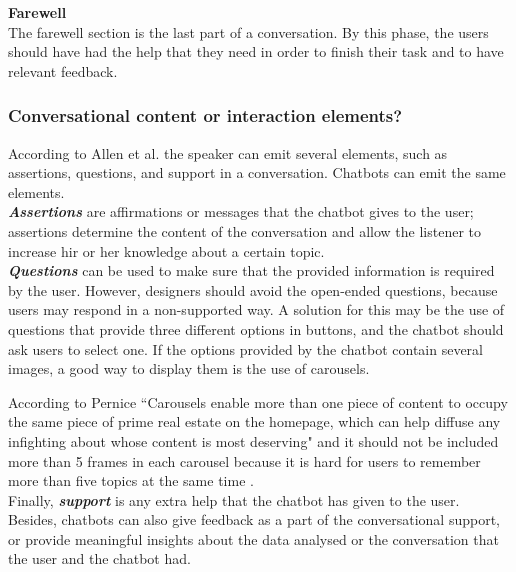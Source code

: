 \documentclass[a4paper,10pt]{article}
\begin{document}
\textbf{Farewell}\\[0\baselineskip]
The farewell section is the last part of a conversation. By this phase, the users should have had the help that they need in order to finish their task and to have relevant feedback.  


\subsubsection*{Conversational content or interaction elements?}
According to Allen et al. \cite{allen1978conversation} the speaker can emit several elements, such as assertions, questions, and support in a conversation. Chatbots can emit the same elements. \\[0\baselineskip]

\textbf{\textit{Assertions}} are affirmations or messages that the chatbot gives to the user; assertions determine the content of the conversation and allow the listener to increase hir or her knowledge about a certain topic. \\[0\baselineskip]

\textbf{\textit{Questions}} can be used to make sure that the provided information is required by the user. However, designers should avoid the open-ended questions, because users may respond in a non-supported way. A solution for this may be the use of questions that provide three different options in buttons, and the chatbot should ask users to select one. If the options provided by the chatbot contain several images, a good way to display them is the use of carousels. 

According to Pernice ``Carousels enable more than one piece of content to occupy the same piece of prime real estate on the homepage, which can help diffuse any infighting about whose content is most deserving" and it should not be included more than 5 frames in each carousel because it is hard for users to remember more than five topics at the same time \cite{carousel}.  \\[0\baselineskip]


Finally, \textbf{\textit{support}} is any extra help that the chatbot has given to the user. Besides, chatbots can also give feedback as a part of the conversational support, or provide meaningful insights about the data analysed or the conversation that the user and the chatbot had. 
\end{document}
